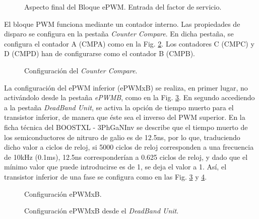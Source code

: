 \documentclass{report}
\begin{document}
\begin{figure}[!h]
    \begin{center}
    \caption{Aspecto final del Bloque ePWM. Entrada del factor de servicio. }
    \label{fig.configuracionpwm4} 
    \end{center}
\end{figure}

El bloque PWM funciona mediante un contador interno. Las propiedades de disparo se configura en la pestaña \textit{Counter Compare}. En dicha pestaña, se configura el contador A (CMPA) como en la Fig. \ref{fig.configuracionpwmcmp}. Los contadores C (CMPC) y D (CMPD) han de configurarse como el contador B (CMPB).

\begin{figure}[!h]
    \begin{center}
    \caption{Configuración del \textit{Counter Compare}.}
    \label{fig.configuracionpwmcmp} 
    \end{center}
\end{figure}

La configuración del ePWM inferior (ePWMxB) se realiza, en primer lugar, no activándolo desde la pestaña \textit{ePWMB}, como en la Fig. \ref{fig.configuracionpwm3_1}. En segundo accediendo a la pestaña \textit{DeadBand Unit}, se activa la opción de tiempo muerto para el transistor inferior, de manera que éste sea el inverso del PWM superior. En la ficha técnica del BOOSTXL - 3PhGaNInv se describe que el tiempo muerto de los semiconductores de nitruro de galio es de 12.5ns, por lo que, traduciendo dicho valor a ciclos de reloj, si 5000 ciclos de reloj corresponden a una frecuencia de 10kHz (0.1ms), 12.5ns corresponderían a 0.625 ciclos de reloj, y dado que el mínimo valor que puede introducirse es de 1, se deja el valor a 1. Así, el transistor inferior de una fase se configura como en las Fig. \ref{fig.configuracionpwm3_1} y \ref{fig.configuracionpwm3_2}.
\begin{figure}[!h]
    \begin{center}
    \caption{Configuración ePWMxB. }
    \label{fig.configuracionpwm3_1} 
    \end{center}
\end{figure}

\begin{figure}[!h]
    \begin{center}
    \caption{Configuración ePWMxB desde el \textit{DeadBand Unit}.}
    \label{fig.configuracionpwm3_2} 
    \end{center}
\end{figure}
\end{document}
